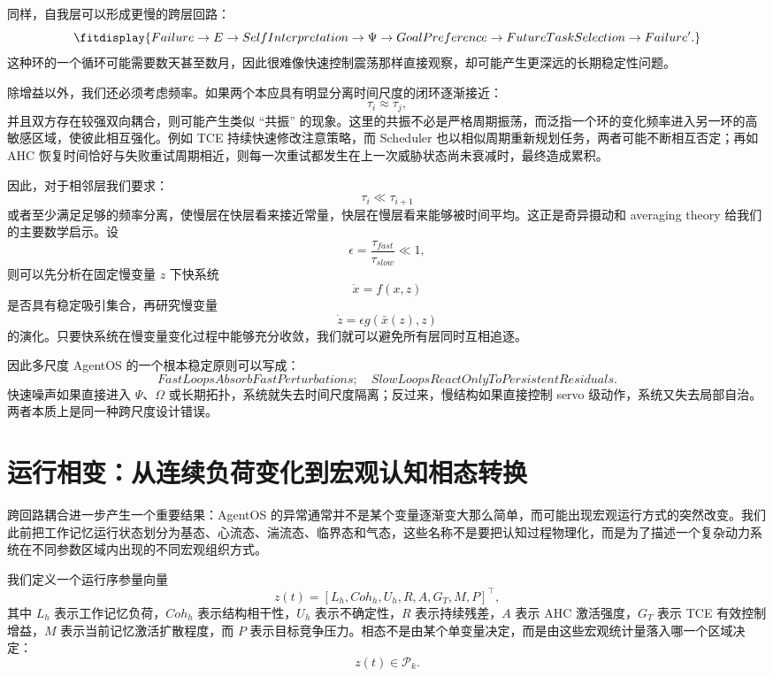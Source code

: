 同样，自我层可以形成更慢的跨层回路：
\[
\fitdisplay{
Failure
\rightarrow
E
\rightarrow
SelfInterpretation
\rightarrow
\Psi
\rightarrow
GoalPreference
\rightarrow
FutureTaskSelection
\rightarrow
Failure'.
}
\]
这种环的一个循环可能需要数天甚至数月，因此很难像快速控制震荡那样直接观察，却可能产生更深远的长期稳定性问题。

除增益以外，我们还必须考虑频率。如果两个本应具有明显分离时间尺度的闭环逐渐接近：
\[
\tau_i
\approx
\tau_j,
\]
并且双方存在较强双向耦合，则可能产生类似 ``共振'' 的现象。这里的共振不必是严格周期振荡，而泛指一个环的变化频率进入另一环的高敏感区域，使彼此相互强化。例如 TCE 持续快速修改注意策略，而 Scheduler 也以相似周期重新规划任务，两者可能不断相互否定；再如 AHC 恢复时间恰好与失败重试周期相近，则每一次重试都发生在上一次威胁状态尚未衰减时，最终造成累积。

因此，对于相邻层我们要求：
\[
\boxed{
\tau_i
\ll
\tau_{i+1}
}
\]
或者至少满足足够的频率分离，使慢层在快层看来接近常量，快层在慢层看来能够被时间平均。这正是奇异摄动和 averaging theory 给我们的主要数学启示。设
\[
\epsilon
=
\frac{\tau_{fast}}{\tau_{slow}}
\ll1,
\]
则可以先分析在固定慢变量 $z$ 下快系统
\[
\dot x
=
f(x,z)
\]
是否具有稳定吸引集合，再研究慢变量
\[
\dot z
=
\epsilon g(\bar x(z),z)
\]
的演化。只要快系统在慢变量变化过程中能够充分收敛，我们就可以避免所有层同时互相追逐。

因此多尺度 AgentOS 的一个根本稳定原则可以写成：
\[
\boxed{
FastLoopsAbsorbFastPerturbations;
\quad
SlowLoopsReactOnlyToPersistentResiduals.
}
\]
快速噪声如果直接进入 $\Psi$、$\Omega$ 或长期拓扑，系统就失去时间尺度隔离；反过来，慢结构如果直接控制 servo 级动作，系统又失去局部自治。两者本质上是同一种跨尺度设计错误。

\section{运行相变：从连续负荷变化到宏观认知相态转换}

跨回路耦合进一步产生一个重要结果：AgentOS 的异常通常并不是某个变量逐渐变大那么简单，而可能出现宏观运行方式的突然改变。我们此前把工作记忆运行状态划分为基态、心流态、湍流态、临界态和气态，这些名称不是要把认知过程物理化，而是为了描述一个复杂动力系统在不同参数区域内出现的不同宏观组织方式。

我们定义一个运行序参量向量
\[
z(t)
=
\left[
L_h,
Coh_h,
U_h,
R,
A,
G_T,
M,
P
\right]^{\top},
\]
其中 $L_h$ 表示工作记忆负荷，$Coh_h$ 表示结构相干性，$U_h$ 表示不确定性，$R$ 表示持续残差，$A$ 表示 AHC 激活强度，$G_T$ 表示 TCE 有效控制增益，$M$ 表示当前记忆激活扩散程度，而 $P$ 表示目标竞争压力。相态不是由某个单变量决定，而是由这些宏观统计量落入哪一个区域决定：
\[
z(t)\in\mathcal P_k.
\]

